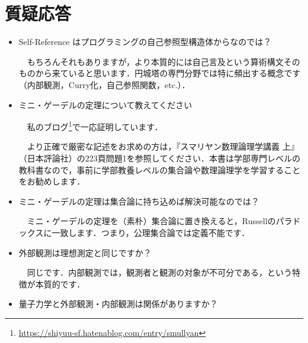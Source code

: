 \documentclass[10pt, a5paper, twoside]{jsarticle}
\begin{document}
	\section{質疑応答}

		\begin{itemize}

			\item Self-Reference はプログラミングの自己参照型構造体からなのでは？

			\vspace{1mm}

			　もちろんそれもありますが，より本質的には自己言及という算術構文そのものから来ていると思います．円城塔の専門分野では特に頻出する概念です（内部観測，Curry化，自己参照関数，etc.）．

			\vspace{2mm}

			\item ミニ・ゲーデルの定理について教えてください

			\vspace{1mm}

			　私のブログ\footnote{\url{https://shiyuu-sf.hatenablog.com/entry/smullyan}}で一応証明しています．

			　より正確で厳密な記述をお求めの方は，『スマリヤン数理論理学講義 上』（日本評論社）の223頁問題1を参照してください．本書は学部専門レベルの教科書なので，事前に学部教養レベルの集合論や数理論理学を学習することをお勧めします．

			\vspace{2mm}

			\item ミニ・ゲーデルの定理は集合論に持ち込めば解決可能なのでは？

			\vspace{1mm}
			
			　ミニ・ゲーデルの定理を（素朴）集合論に置き換えると，Russellのパラドックスに一致します．つまり，公理集合論では定義不能です．

			\vspace{2mm}

			\item 外部観測は理想測定と同じですか？

			\vspace{1mm}

			　同じです．内部観測では，観測者と観測の対象が不可分である，という特徴が本質的です．

			\vspace{2mm}

			\item 量子力学と外部観測・内部観測は関係がありますか？


\end{itemize}
\end{document}
